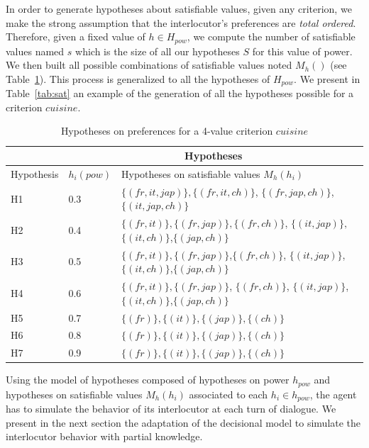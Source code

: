 \documentclass[conference, letterpaper]{IEEEtran}
\begin{document}
	In order to generate hypotheses about satisfiable values, given any criterion, we make the strong assumption that the interlocutor's preferences are \emph{total ordered}. Therefore, given a fixed value of $h \in H_{pow}$, we compute the number of satisfiable values named $s$ which is the size of all our hypotheses $S$ for this value of power. 
	We then built all possible combinations of satisfiable values noted $M_h()$ (see Table~\ref{tab:hypo}). This process is generalized to all the hypotheses of $H_{pow}$. We present in Table~\ref{tab:sat} an example of the generation of all the hypotheses possible for a criterion $cuisine$.
	
	\begin{table}[h]
		\centering
		\caption{Hypotheses on preferences for a 4-value criterion $cuisine$}
		\begin{tabular}{ |p{1.4cm}|p{1cm}|p{5cm}| }
			\hline
			& \multicolumn{2}{c|}{Hypotheses}  \\
			\hline
			Hypothesis & $h_i(pow)$ & Hypotheses on satisfiable values $ M_h(h_i)$\\
			\hline
			H1&0.3&$\{(fr,it,jap)\} , \{(fr,it,ch)\}$, $\{(fr,jap,ch)\}$,$\{(it,jap,ch)\}$ \\
			\hline
			H2&0.4&$\{(fr,it)\}, \{(fr,jap)\}, \{(fr,ch)\}$, $\{(it,jap)\},$ $\{(it,ch)\}$,$\{(jap,ch)\}$ \\
			\hline
			H3&0.5&$\{(fr,it)\}, \{(fr,jap)\}$,$\{(fr,ch)\}$, $\{(it,jap)\}$,$\{(it,ch)\}$,$\{(jap,ch)\}$\\
			\hline
			H4&0.6&$\{(fr,it)\}, \{(fr,jap)\}$, $\{(fr,ch)\}$, $\{(it,jap)\}$,$\{(it,ch)\}$,$\{(jap,ch)\}$ \\
			\hline
			H5&0.7&$\{(fr)\}, \{(it)\}, \{(jap)\}, \{(ch)\}$\\
			\hline
			H6&0.8&$\{(fr)\}, \{(it)\}, \{(jap)\}, \{(ch)\}$ \\
			\hline
			
			H7&0.9&$\{(fr)\}, \{(it)\}, \{(jap)\}, \{(ch)\}$ \\
			\hline
		\end{tabular}		
		\label{tab:hypo}
	\end{table}
	
	Using the model of hypotheses composed of hypotheses on power $h_{pow}$ and hypotheses on satisfiable values $ M_h(h_i)$ associated to each $h_i \in h_{pow}$, the agent has to simulate the behavior of its interlocutor at each turn of dialogue.  
	We present in the next section the adaptation of the decisional model to simulate the interlocutor behavior with partial knowledge.
	
\end{document}
